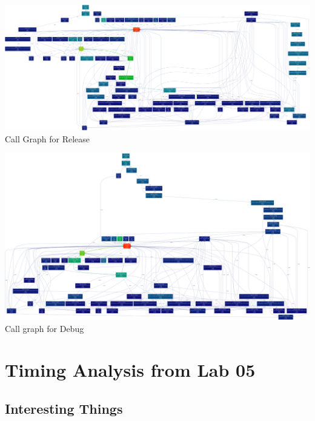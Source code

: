 \documentclass[11pt]{article}
\begin{document}
\begin{center}
\includegraphics[scale=0.1]{../plots/releaseoutput.png}\\
Call Graph for Release
\end{center}
\begin{center}
\includegraphics[scale=0.1]{../plots/debugoutput.png}\\
Call graph for Debug
\end{center}

\section{Timing Analysis from Lab 05}
\subsection{Interesting Things}
\end{document}
